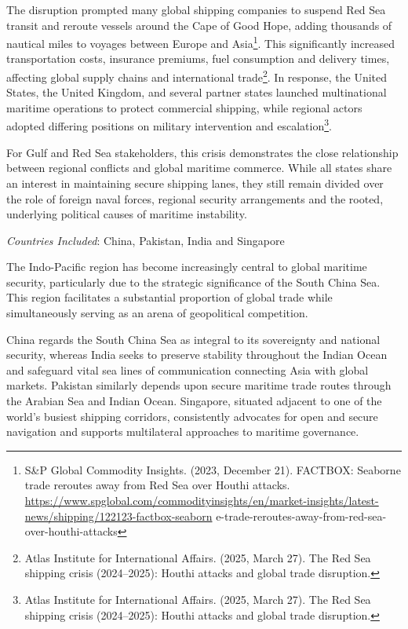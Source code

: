 The disruption prompted many global shipping companies to suspend Red Sea transit and reroute vessels around the Cape of Good Hope, adding thousands of nautical miles to voyages between Europe and Asia\footnote{S\&P Global Commodity Insights. (2023, December 21). FACTBOX: Seaborne trade reroutes away from Red Sea over Houthi attacks. \url{https://www.spglobal.com/commodityinsights/en/market-insights/latest-news/shipping/122123-factbox-seaborn} e-trade-reroutes-away-from-red-sea-over-houthi-attacks}. This significantly increased transportation costs, insurance premiums, fuel consumption and delivery times, affecting global supply chains and international trade\footnote{Atlas Institute for International Affairs. (2025, March 27). The Red Sea shipping crisis (2024–2025): Houthi attacks and global trade disruption.}. In response, the United States, the United Kingdom, and several partner states launched multinational maritime operations to protect commercial shipping, while regional actors adopted differing positions on military intervention and escalation\footnote{Atlas Institute for International Affairs. (2025, March 27). The Red Sea shipping crisis (2024–2025): Houthi attacks and global trade disruption.}.

For Gulf and Red Sea stakeholders, this crisis demonstrates the close relationship between regional conflicts and global maritime commerce. While all states share an interest in maintaining secure shipping lanes, they still remain divided over the role of foreign naval forces, regional security arrangements and the rooted, underlying political causes of maritime instability.


\emph{Countries Included}: China, Pakistan, India and Singapore

The Indo-Pacific region has become increasingly central to global maritime security, particularly due to the strategic significance of the South China Sea. This region facilitates a substantial proportion of global trade while simultaneously serving as an arena of geopolitical competition.

China regards the South China Sea as integral to its sovereignty and national security, whereas India seeks to preserve stability throughout the Indian Ocean and safeguard vital sea lines of communication connecting Asia with global markets. Pakistan similarly depends upon secure maritime trade routes through the Arabian Sea and Indian Ocean. Singapore, situated adjacent to one of the world's busiest shipping corridors, consistently advocates for open and secure navigation and supports multilateral approaches to maritime governance.

